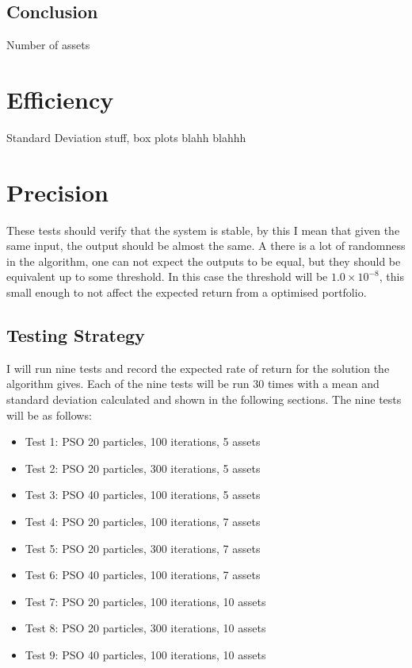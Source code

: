 \documentclass{pdfmx4020}
\begin{document}

    \subsection{Conclusion} %
    \label{sub:conclusion}
      

    Number of assets

  \section{Efficiency} %
  \label{sec:efficiency}
    Standard Deviation stuff, box plots blahh blahhh

  \section{Precision} %
  \label{sec:precision}
  These tests should verify that the system is stable, by this I mean that given the same input, the output should be almost the same. A there is a lot of randomness in the algorithm, one can not expect the outputs to be equal, but they should be equivalent up to some threshold. In this case the threshold will be $1.0\times10^{-8}$, this small enough to not affect the expected return from a optimised portfolio.

    \subsection{Testing Strategy} %
    \label{sub:testing_strategy}
      I will run nine tests and record the expected rate of return for the solution the algorithm gives. Each of the nine tests will be run 30 times with a mean and standard deviation calculated and shown in the following sections. The nine tests will be as follows:
        \begin{itemize}
          \item Test 1: PSO 20 particles, 100 iterations, 5 assets
          \item Test 2: PSO 20 particles, 300 iterations, 5 assets
          \item Test 3: PSO 40 particles, 100 iterations, 5 assets
          \item Test 4: PSO 20 particles, 100 iterations, 7 assets
          \item Test 5: PSO 20 particles, 300 iterations, 7 assets
          \item Test 6: PSO 40 particles, 100 iterations, 7 assets
          \item Test 7: PSO 20 particles, 100 iterations, 10 assets
          \item Test 8: PSO 20 particles, 300 iterations, 10 assets
          \item Test 9: PSO 40 particles, 100 iterations, 10 assets
        \end{itemize}
\end{document}
